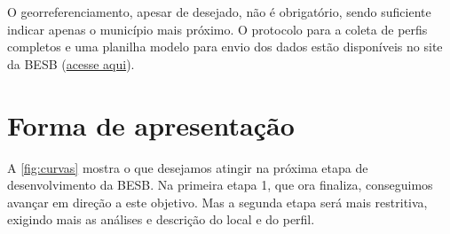 O georreferenciamento, apesar de desejado, não é obrigatório, sendo suficiente indicar apenas o município mais próximo. O protocolo para a coleta de perfis completos e uma planilha modelo para envio dos dados estão disponíveis no site da BESB (\href{http://bibliotecaespectral.wix.com/esalq#!protocolo/c1sc5}{acesse aqui}). 

\section{Forma de apresentação}

A \autoref{fig:curvas} mostra o que desejamos atingir na próxima etapa de desenvolvimento da BESB. Na primeira etapa 1, que ora finaliza, conseguimos avançar em direção a este objetivo. Mas a segunda etapa será mais restritiva, exigindo mais as análises e descrição do local e do perfil.

